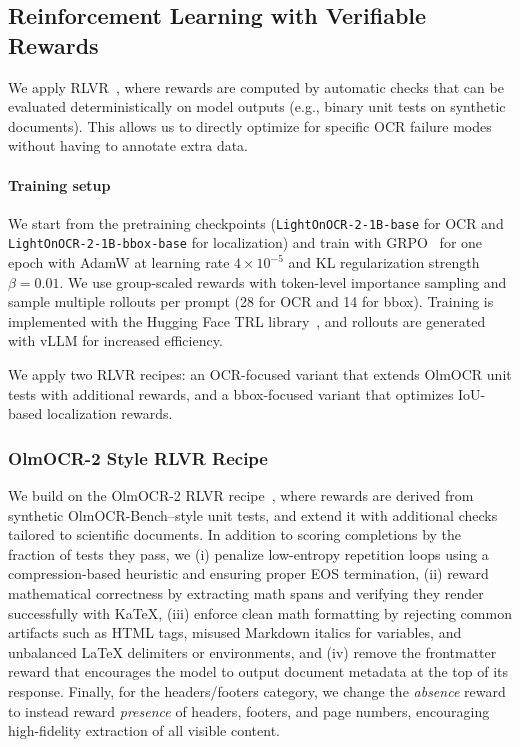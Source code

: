 \documentclass{article}
\begin{document}
\subsection{Reinforcement Learning with Verifiable Rewards}
We apply RLVR~\cite{Lambert2024TLU3P}, where rewards are computed by automatic checks that can be evaluated deterministically on model outputs (e.g., binary unit tests on synthetic documents). This allows us to directly optimize for specific OCR failure modes without having to annotate extra data.

\paragraph{Training setup}
We start from the pretraining checkpoints (\texttt{LightOnOCR-2-1B-base} for OCR and  \texttt{LightOnOCR-2-1B-bbox-base} for localization) and train with GRPO~\cite{shao2024deepseekmath} for one epoch with AdamW at learning rate $4\times10^{-5}$ and KL regularization strength $\beta=0.01$.
We use group-scaled rewards with token-level importance sampling and sample multiple rollouts per prompt (28 for OCR and 14 for bbox). Training is implemented with the Hugging Face TRL library~\cite{huggingface_trl}, and rollouts are generated with vLLM for increased efficiency.

We apply two RLVR recipes: an OCR-focused variant that extends OlmOCR unit tests with additional rewards, and a bbox-focused variant that optimizes IoU-based localization rewards.


\label{sec:rl}
\subsubsection{OlmOCR-2 Style RLVR Recipe}
\label{sec:ocr_rlvr}
We build on the OlmOCR-2 RLVR recipe~\cite{poznanski2025olmocr2}, where rewards are derived from synthetic OlmOCR-Bench–style unit tests, and extend it with additional checks tailored to scientific documents. In addition to scoring completions by the fraction of tests they pass, we (i) penalize low-entropy repetition loops using a compression-based heuristic and ensuring proper EOS termination, (ii) reward mathematical correctness by extracting math spans and verifying they render successfully with KaTeX, (iii) enforce clean math formatting by rejecting common artifacts such as HTML tags, misused Markdown italics for variables, and unbalanced \LaTeX{} delimiters or environments, and (iv) remove the frontmatter reward that encourages the model to output document metadata at the top of its response. Finally, for the headers/footers category, we change the \emph{absence} reward to instead reward \emph{presence} of headers, footers, and page numbers, encouraging high-fidelity extraction of all visible content.
\end{document}
